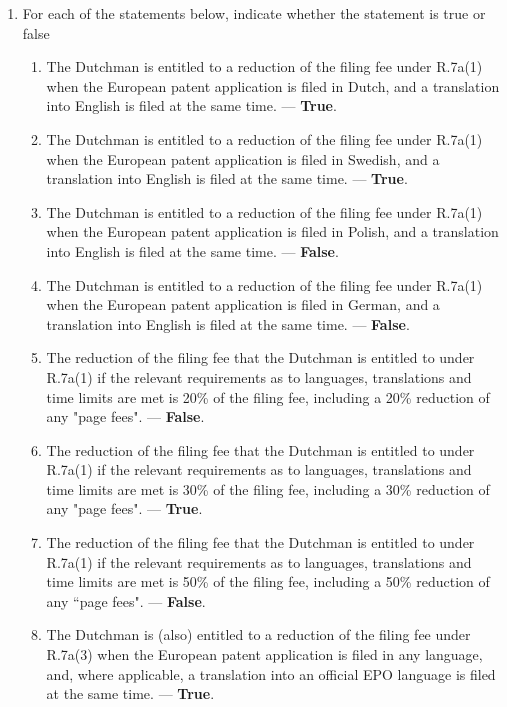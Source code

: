 \documentclass{report}
\begin{document}
\begin{enumerate}[label=\textbf{Answer \arabic*}]
\begin{enumerate}[label=\textbf{Answer \arabic*}]
\begin{enumerate}[label=(\alph*)]
        \item For each of the statements below, indicate whether the statement is true or false
        \begin{enumerate}[label={(\alph{enumi}.\arabic*)}]
            \item The Dutchman is entitled to a reduction of the filing fee under R.7a(1) when the European patent application is filed in Dutch, and a translation into English is filed at the same time. --- \textbf{True}.
            \item The Dutchman is entitled to a reduction of the filing fee under R.7a(1) when the European patent application is filed in Swedish, and a translation into English is filed at the same time. --- \textbf{True}.
            \item The Dutchman is entitled to a reduction of the filing fee under R.7a(1) when the European patent application is filed in Polish, and a translation into English is filed at the same time. --- \textbf{False}.
            \item The Dutchman is entitled to a reduction of the filing fee under R.7a(1) when the European patent application is filed in German, and a translation into English is filed at the same time. --- \textbf{False}.
            \item The reduction of the filing fee that the Dutchman is entitled to under R.7a(1) if the relevant requirements as to languages, translations and time limits are met is 20\% of the filing fee, including a 20\% reduction of any "page fees".  --- \textbf{False}.
            \item The reduction of the filing fee that the Dutchman is entitled to under R.7a(1) if the relevant requirements as to languages, translations and time limits are met is 30\% of the filing fee, including a 30\% reduction of any "page fees". --- \textbf{True}.
            \item The reduction of the filing fee that the Dutchman is entitled to under R.7a(1) if the relevant requirements as to languages, translations and time limits are met is 50\% of the filing fee, including a 50\% reduction of any “page fees". --- \textbf{False}.
            \item The Dutchman is (also) entitled to a reduction of the filing fee under R.7a(3) when the European patent application is filed in any language, and, where applicable, a translation into an official EPO language is filed at the same time. --- \textbf{True}.
        \end{enumerate}
        

\end{enumerate}
\end{enumerate}
\end{enumerate}
\end{document}

